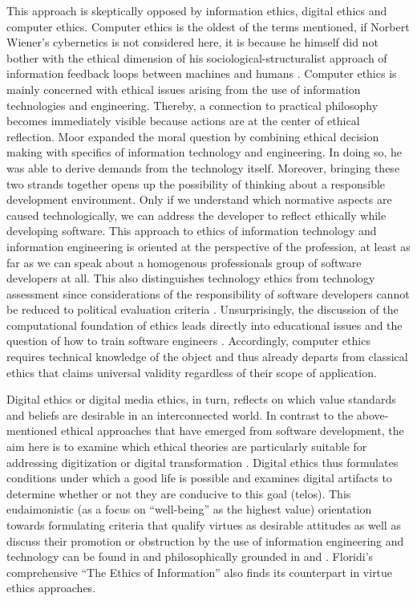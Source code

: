 \documentclass[manuscript,screen]{acmart}
\begin{document}
This approach is skeptically opposed by information ethics, digital ethics and computer ethics. Computer ethics is the oldest of the terms mentioned, if Norbert Wiener's cybernetics is not considered here, it is because he himself did not bother with the ethical dimension of his sociological-structuralist approach of information feedback loops between machines and humans \citep{wiener1988human}. Computer ethics is mainly concerned with ethical issues arising from the use of information technologies and engineering. Thereby, a connection to practical philosophy becomes immediately visible because actions are at the center of ethical reflection. Moor \citep{moor1985computer} expanded the moral question by combining ethical decision making with specifics of information technology and engineering. In doing so, he was able to derive demands from the technology itself. Moreover, bringing these two strands together opens up the possibility of thinking about a responsible development environment. Only if we understand which normative aspects are caused technologically, we can address the developer to reflect ethically while developing software. This approach to ethics of information technology and information engineering is oriented at the perspective of the profession, at least as far as we can speak about a homogenous professionals group of software developers at all. This also distinguishes technology ethics from technology assessment since considerations of the responsibility of software developers cannot be reduced to political evaluation criteria \citep{skorupinski2000technikfolgenabschatzung}. Unsurprisingly, the discussion of the computational foundation of ethics leads directly into educational issues and the question of how to train software engineers \citep{johnson1985computer}\citep{maner1999computer}. Accordingly, computer ethics requires technical knowledge of the object and thus already departs from classical ethics that claims universal validity regardless of their scope of application. 

Digital ethics or digital media ethics, in turn, reflects on which value standards and beliefs are desirable in an interconnected world. In contrast to the above-mentioned ethical approaches that have emerged from software development, the aim here is to examine which ethical theories are particularly suitable for addressing digitization or digital transformation \citep{capurro2020digitale}. Digital ethics thus formulates conditions under which a good life is possible and examines digital artifacts to determine whether or not they are conducive to this goal (telos). This eudaimonistic (as a focus on “well-being” as the highest value) orientation towards formulating criteria that qualify virtues as desirable attitudes as well as discuss their promotion or obstruction by the use of information engineering and technology can be found in \citep{spiekermann2019digitale} and philosophically grounded in \citep{vallor2016technology} and \citep{reijers2020narrative}. Floridi's \citep{floridi2013ethics} comprehensive “The Ethics of Information'' also finds its counterpart in virtue ethics approaches. 
\end{document}
